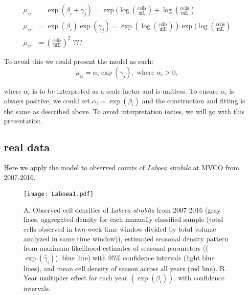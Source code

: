 \documentclass[11pt]{article}
\begin{document}
\begin{align}
\mu_{ij} &= \exp(\beta_i +\gamma_j) = \exp( \log (\frac{\text{cells}}{\text{mL}}) + \log(\frac{\text{cells}}{\text{mL}}) \\
\mu_{ij} &= \exp(\beta_i)\exp(\gamma_j) = \exp(\log(\frac{\text{cells}}{\text{mL}}))\exp(\log(\frac{\text{cells}}{\text{mL}}) \\
\mu_{ij} &= \left( \frac{\text{cells}}{\text{mL}}\right)^{2} \text{  ???}
\end{align}

To avoid this we could present the model as such:
\[
\mu_{ij} = \alpha_i\exp(\gamma_j), \text{ where } \alpha_i > 0,
\]

\noindent where $\alpha_i$ is to be interpreted as a scale factor and is unitless. To ensure $\alpha_i$ is always positive, we could set $\alpha_i =\exp(\beta_i)$ and the construction and fitting is the same as described above. To avoid interpretation issues, we will go with this presentation.


%


\subsection{real data}

Here we apply the model to observed counts of \textit{Laboea strobila} at MVCO from 2007-2016. 

\begin{figure}[h]
\centering
\texttt{[image: Laboea1.pdf]}
\caption{A. Observed cell densities of \textit{Laboea strobila} from 2007-2016 (gray lines, aggregated density for each manually classified sample (total cells observed in two-week time window divided by total volume analyzed in same time window)), estimated seasonal density pattern from maximum likelihood estimates of seasonal parameters (($\exp(\hat{\gamma}_i)$), blue line) with 95\% confidence intervals (light blue lines), and mean cell density of season across all years (red line). B. Year multiplier effect for each year $(\exp(\beta_i))$, with confidence intervals.}
\end{figure}
\end{document}
